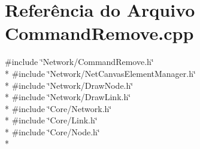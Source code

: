 \section{Referência do Arquivo Command\+Remove.\+cpp}
\label{_command_remove_8cpp}
{\ttfamily \#include \char`\"{}Network/\+Command\+Remove.\+h\char`\"{}}\\*
{\ttfamily \#include \char`\"{}Network/\+Net\+Canvas\+Element\+Manager.\+h\char`\"{}}\\*
{\ttfamily \#include \char`\"{}Network/\+Draw\+Node.\+h\char`\"{}}\\*
{\ttfamily \#include \char`\"{}Network/\+Draw\+Link.\+h\char`\"{}}\\*
{\ttfamily \#include \char`\"{}Core/\+Network.\+h\char`\"{}}\\*
{\ttfamily \#include \char`\"{}Core/\+Link.\+h\char`\"{}}\\*
{\ttfamily \#include \char`\"{}Core/\+Node.\+h\char`\"{}}\\*
